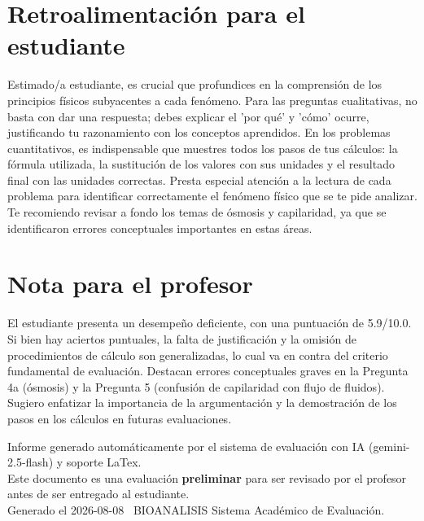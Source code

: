 \documentclass[11pt,a4paper]{article}
\begin{document}
\section*{Retroalimentación para el estudiante}
\begin{tcolorbox}[cajaRecomendacion, title={Dirigido a: Barbara Marcano}]
Estimado/a estudiante, es crucial que profundices en la comprensión de los principios físicos subyacentes a cada fenómeno. Para las preguntas cualitativas, no basta con dar una respuesta; debes explicar el 'por qué' y 'cómo' ocurre, justificando tu razonamiento con los conceptos aprendidos. En los problemas cuantitativos, es indispensable que muestres todos los pasos de tus cálculos: la fórmula utilizada, la sustitución de los valores con sus unidades y el resultado final con las unidades correctas. Presta especial atención a la lectura de cada problema para identificar correctamente el fenómeno físico que se te pide analizar. Te recomiendo revisar a fondo los temas de ósmosis y capilaridad, ya que se identificaron errores conceptuales importantes en estas áreas.
\end{tcolorbox}

\section*{Nota para el profesor}
\begin{tcolorbox}[
  enhanced, breakable,
  colback=yellow!8, colframe=yellow!60!black,
  fonttitle=\bfseries, coltitle=black,
  title={Observaciones para revisión manual},
  top=4pt, bottom=4pt, left=8pt, right=8pt,
]
El estudiante presenta un desempeño deficiente, con una puntuación de 5.9/10.0. Si bien hay aciertos puntuales, la falta de justificación y la omisión de procedimientos de cálculo son generalizadas, lo cual va en contra del criterio fundamental de evaluación. Destacan errores conceptuales graves en la Pregunta 4a (ósmosis) y la Pregunta 5 (confusión de capilaridad con flujo de fluidos). Sugiero enfatizar la importancia de la argumentación y la demostración de los pasos en los cálculos en futuras evaluaciones.
\end{tcolorbox}

\vspace{12pt}
\begin{center}
  \footnotesize\color{gray}
  Informe generado automáticamente por el sistema de evaluación con IA (gemini-2.5-flash) y soporte LaTex. \\
  Este documento es una evaluación \textbf{preliminar} para ser revisado por el profesor antes de ser entregado al 
  estudiante. \\
  Generado el 2026-08-08 \textbullet\ BIOANALISIS Sistema Académico de Evaluación.
  \end{center}
\end{document}

